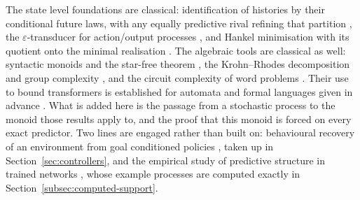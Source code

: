 \documentclass[10pt]{article}
\theoremstyle{definition}
\theoremstyle{remark}
\begin{document}
The state level foundations are classical: identification of histories
by their conditional future laws, with any equally predictive rival
refining that partition
\cite{CrutchfieldYoung1989,ShaliziCrutchfield2001}, the
$\varepsilon$-transducer for action/output processes
\cite{BarnettCrutchfield2015}, and Hankel minimisation
with its quotient onto the minimal realisation
\cite{Fliess1974,Jaeger2000}.  The algebraic tools are classical as
well: syntactic monoids and the star-free theorem
\cite{Pin1986,Schutzenberger1965}, the Krohn--Rhodes decomposition
and group complexity \cite{KrohnRhodes1965,RhodesSteinberg2009}, and
the circuit complexity of word problems
\cite{BarringtonTherien1988,Barrington1989,BarringtonEtAl1992}.
Their use to bound transformers is established for automata and
formal languages given in advance
\cite{MerrillSabharwal2023,LiuEtAl2023,YangChiangAngluin2024}.  What
is added here is the passage from a stochastic process to the monoid
those results apply to, and the proof that this monoid is forced on
every exact predictor.  Two lines are engaged rather than built on:
behavioural recovery of an environment from goal conditioned policies
\cite{Richens2025,Cifuentes2026,LuEtAl2026}, taken up in
Section~\ref{sec:controllers}, and the empirical study of predictive
structure in trained networks \cite{ShaiEtAl2024}, whose example
processes are computed exactly in
Section~\ref{subsec:computed-support}.
\end{document}
